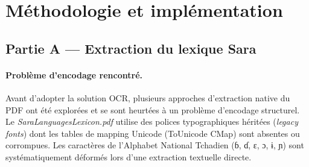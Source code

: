 \documentclass[11pt, a4paper, oneside]{article}
\begin{document}
\section{Méthodologie et implémentation}

\subsection{Partie A — Extraction du lexique Sara}

\paragraph{Problème d'encodage rencontré.} Avant d'adopter la solution OCR, plusieurs approches d'extraction native du PDF ont été explorées et se sont heurtées à un problème d'encodage structurel. Le \emph{SaraLanguagesLexicon.pdf} utilise des polices typographiques héritées (\emph{legacy fonts}) dont les tables de mapping Unicode (ToUnicode CMap) sont absentes ou corrompues. Les caractères de l'Alphabet National Tchadien (ɓ, ɗ, ɛ, ɔ, ɨ, ɲ) sont systématiquement déformés lors d'une extraction textuelle directe.
\end{document}

